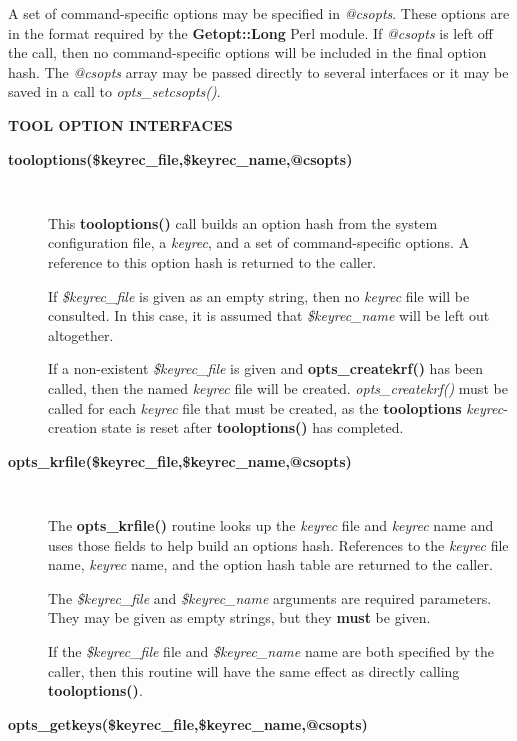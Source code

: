A set of command-specific options may be specified in {\it @csopts}.  These
options are in the format required by the {\bf Getopt::Long} Perl module.  If
{\it @csopts} is left off the call, then no command-specific options will be
included in the final option hash.  The {\it @csopts} array may be passed
directly to several interfaces or it may be saved in a call to {\it
opts\_setcsopts()}.


{\bf TOOL OPTION INTERFACES}

\begin{description}

\item [{\bf tooloptions(\$keyrec\_file,\$keyrec\_name,@csopts)}]\verb" "

This {\bf tooloptions()} call builds an option hash from the system
configuration file, a {\it keyrec}, and a set of command-specific options.
A reference to this option hash is returned to the caller.

If {\it \$keyrec\_file} is given as an empty string, then no {\it keyrec}
file will be consulted.  In this case, it is assumed that {\it \$keyrec\_name}
will be left out altogether.

If a non-existent {\it \$keyrec\_file} is given and {\bf opts\_createkrf()}
has been called, then the named {\it keyrec} file will be created.  {\it
opts\_createkrf()} must be called for each {\it keyrec} file that must be
created, as the {\bf tooloptions} {\it keyrec}-creation state is reset after
{\bf tooloptions()} has completed.

\item [{\bf opts\_krfile(\$keyrec\_file,\$keyrec\_name,@csopts)}]\verb" "

The {\bf opts\_krfile()} routine looks up the {\it keyrec} file and {\it
keyrec} name and uses those fields to help build an options hash.  References
to the {\it keyrec} file name, {\it keyrec} name, and the option hash table
are returned to the caller.

The {\it \$keyrec\_file} and {\it \$keyrec\_name} arguments are required
parameters.  They may be given as empty strings, but they {\bf must} be given.

If the {\it \$keyrec\_file} file and {\it \$keyrec\_name} name are both
specified by the caller, then this routine will have the same effect as
directly calling {\bf tooloptions()}.


\item [{\bf opts\_getkeys(\$keyrec\_file,\$keyrec\_name,@csopts)}]\verb" "


\end{description}
